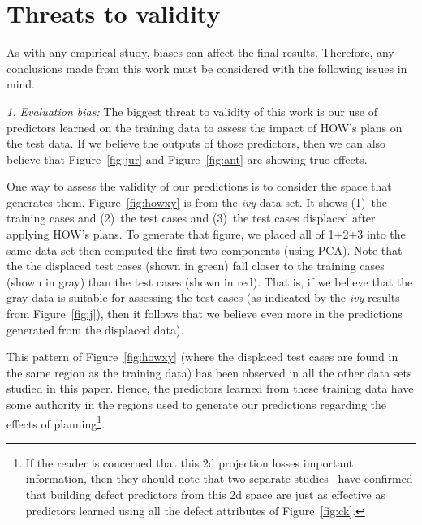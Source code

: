 \documentclass[conference]{IEEEtran}
\newcommand{\fig}[1]{Figure~\ref{fig:#1}}
\begin{document}
\section{Threats to validity}

 

As with any empirical study, biases can affect the final results. Therefore, any
conclusions made from this work must be considered with the following issues in
mind.


{\em 1. Evaluation bias:} The biggest threat to validity of this work is our use
of predictors learned on the training data to assess the impact of HOW's plans
on the test data.
If we believe the outputs of those predictors, then we can also believe that
\fig{jur} and \fig{ant} are showing true effects.  
 
One way to assess the validity of our predictions is to consider the space that generates
them. \fig{howxy} is from the {\em ivy} data
set. It shows (1)~the training cases and (2)~the test cases and (3)~the
test cases displaced after applying HOW's plans.
To generate that figure, we placed all of 1+2+3 into the same data set then computed the first
two  components (using PCA). Note that the  the   displaced test
cases  (shown in green)  fall closer to the training cases (shown in gray) than
the test cases (shown in red).  That is, if we believe
that the gray data is  suitable for assessing
the test cases (as indicated by the {\em ivy} results from \fig{j}), then it follows
that we believe even more in the predictions
generated from the displaced data).

This pattern of \fig{howxy} (where the displaced test cases are found in the same
region as the training data) has been observed in all the other data sets studied in this
paper. Hence, the
predictors learned from these training data have some authority in the regions
used to generate our predictions regarding the effects of planning\footnote{If the reader is concerned that this 2d projection
losses important information, then they should note that two separate  studies~\cite{papa13,divya15}
have confirmed that building defect predictors from this 2d space are just as effective
as predictors learned using all the defect attributes of \fig{ck}.}. 
\end{document}
